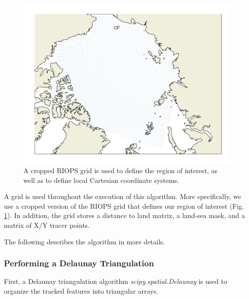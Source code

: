 \documentclass[draft]{agujournal2018}
\begin{document}
\begin{figure}[h]
 \begin{center}
   \includegraphics[scale=.4]{figures/grid_lines.png}
 \end{center}
 \caption{A cropped RIOPS grid is used to define the region of interest, as well as to define local Cartesian coordinate systems.}
 \label{grid}
\end{figure}

A grid is used throughout the execution of this algorithm. More specifically, we use a cropped version of the RIOPS grid that defines our region of interest (Fig. \ref{grid}). In addition, the grid stores a distance to land matrix, a land-sea mask, and a matrix of X/Y tracer points. 

The following describes the algorithm in more details.



\subsubsection{Performing a Delaunay Triangulation}

First, a Delaunay triangulation algorithm \textit{scipy.spatial.Delaunay} is used to organize the tracked features into triangular arrays. 
\end{document}
